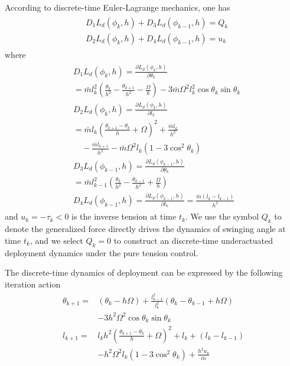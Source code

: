 \documentclass[10pt,final,journal]{IEEEtran}
\newcommand{\NPR}{\setcounter{equation}{\value{mytempeqncnt}}
\hrulefill
\vspace*{4pt}
\end{figure}}
\begin{document}
	According to discrete-time Euler-Lagrange mechanics, one has
	\begin{align}\begin{split}
	&D_1L_d(\phi_k,h)+D_3L_d(\phi_{k-1},h)=Q_k\\
	&D_2L_d(\phi_k,h)+D_4L_d(\phi_{k-1},h)=u_k
	\end{split}\end{align}
	where
	\begin{align}\begin{split}
		&D_1L_d(\phi_k,h)=\frac{\partial L_d(\phi_k,h)}{\partial \theta_k}\\
		&=\bar{m}l_k^2\left(\frac{\theta_{k}}{h^2}-\frac{\theta_{k+1}}{h^2}-\frac{\Omega}{h}\right)-3\bar{m}\Omega^2l^2_k\cos\theta_{k}\sin\theta_{k}\\
		&D_2L_d(\phi_k,h)=\frac{\partial L_d(\phi_k,h)}{\partial l_k}\\
		&=\bar{m}l_k\left(\frac{\theta_{k+1}-\theta_{k}}{h}+\Omega\right)^2+\frac{\bar{m}l_k}{h^2}\\
		&\quad-\frac{\bar{m}l_{k+1}}{h^2}-\bar{m}\Omega^2l_k(1-3\cos^2\theta_{k})\\
		&D_3L_d(\phi_{k-1},h)=\frac{\partial L_d(\phi_{k-1},h)}{\partial \theta_k}\\
		&=\bar{m}l^2_{k-1}\left(\frac{\theta_{k}}{h^2}-\frac{\theta_{k-1}}{h^2}+\frac{\Omega}{h}\right)\\
		&D_4L_d(\phi_{k-1},h)=\frac{\partial L_d(\phi_{k-1},h)}{\partial l_k}
		=\frac{\bar{m}(l_k-l_{k-1})}{h^2}
	\end{split}\end{align}
	and $u_k=-\tau_k< 0$ is the inverse tension at time $t_k$. We use the symbol $Q_k$ to denote the generalized force directly drives the dynamics of swinging angle at time $t_k$, and we select $Q_k=0$ to construct an discrete-time underactuated deployment dynamics under the pure tension control. 
	
	The discrete-time dynamics of deployment can be expressed by the following iteration action
	\begin{align}\begin{split}\label{eq:theta_k+1}
		\theta_{k+1}=&\left(\theta_{k}-h\Omega\right)+\frac{l^2_{k-1}}{l^2_k}\left(\theta_{k}-\theta_{k-1}+h\Omega\right)\\
		&-3h^2\Omega^2\cos\theta_{k}\sin\theta_{k}\\
		l_{k+1}=&l_kh^2\left(\frac{\theta_{k+1}-\theta_{k}}{h}+\Omega\right)^2+l_k+(l_k-l_{k-1})\\
		&-h^2\Omega^2l_k(1-3\cos^2\theta_{k})+\frac{h^2u_k}{\bar{m}}
	\end{split}\end{align}
	
\end{document}

